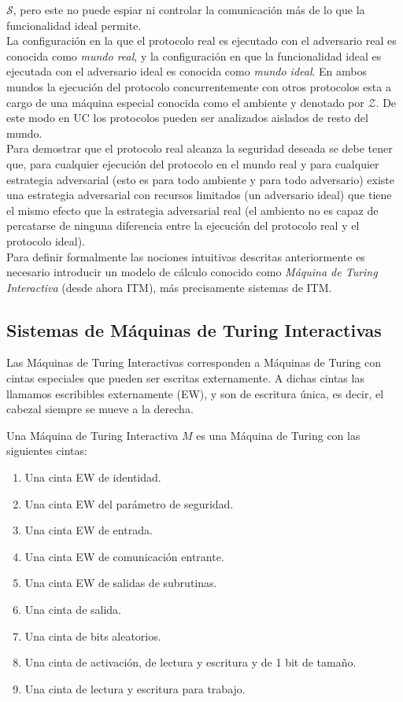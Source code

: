 $\mathcal{S}$, pero este no puede espiar ni controlar la comunicación más de lo que la funcionalidad ideal
permite.\\
La configuración en la que el protocolo real es ejecutado con el adversario real es conocida como \textit{mundo
real}, y la configuración en que la funcionalidad ideal es ejecutada con el adversario ideal es conocida como
\textit{mundo ideal}. En ambos mundos la ejecución del protocolo concurrentemente con otros protocolos esta a cargo
de una máquina especial conocida como el ambiente y denotado por $\mathcal{Z}$. De este modo en UC los protocolos
pueden ser analizados aislados de resto del mundo.\\
Para demostrar que el protocolo real alcanza la seguridad deseada
se debe tener que, para cualquier ejecución del protocolo en el mundo real y para cualquier estrategia adversarial
(esto es para todo ambiente y para todo adversario) existe una estrategia adversarial con recursos limitados (un
adversario ideal) que tiene el mismo efecto que la estrategia adversarial real (el ambiento no es capaz de percatarse
de ninguna diferencia entre la ejecución del protocolo real y el protocolo ideal).\\
Para definir formalmente las nociones intuitivas descritas anteriormente es necesario introducir un modelo de
cálculo conocido como \textit{Máquina de Turing Interactiva} (desde ahora ITM), más precisamente sistemas de ITM.

\subsection{Sistemas de Máquinas de Turing Interactivas}

Las Máquinas de Turing Interactivas corresponden a Máquinas de Turing con cintas especiales que pueden ser
escritas externamente. A dichas cintas las llamamos escribibles externamente (EW), y son de escritura única,
es decir, el cabezal siempre se mueve a la derecha.

\begin{definicion}
Una Máquina de Turing Interactiva $M$ es una Máquina de Turing con las siguientes cintas:
\begin{enumerate}
    \item Una cinta EW de identidad.
    \item Una cinta EW del parámetro de seguridad.
    \item Una cinta EW de entrada.
    \item Una cinta EW de comunicación entrante.
    \item Una cinta EW de salidas de subrutinas.
    \item Una cinta de salida.
    \item Una cinta de bits aleatorios.
    \item Una cinta de activación, de lectura y escritura y de 1 bit de tamaño.
    \item Una cinta de lectura y escritura para trabajo. 
\end{enumerate}
\end{definicion}

